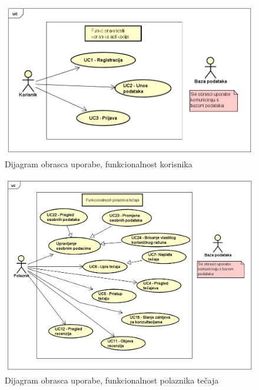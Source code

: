 					\begin{figure}[h]
						\includegraphics[scale=0.68]{dijagrami/UML_kor.PNG}
						\centering
						\caption{Dijagram obrasca uporabe, funkcionalnost korisnika}
						\label{fig:UML_kor}
					\end{figure}
				\eject
					
					\begin{figure}[h]
						\includegraphics[scale=0.6]{dijagrami/UML_pol.PNG}
						\centering
						\caption{Dijagram obrasca uporabe, funkcionalnost polaznika tečaja}
						\label{fig:UML_pol}
					\end{figure}
				\eject
				
